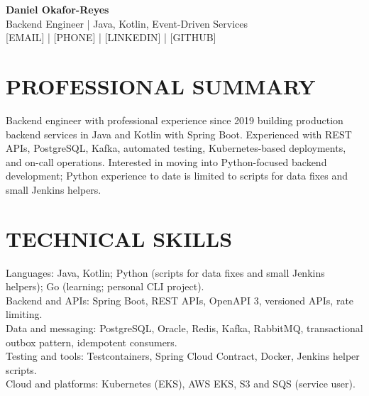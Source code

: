 \documentclass[11pt,a4paper]{article}
\begin{document}
\begin{center}
{\Huge\bfseries\color{primarycolor} Daniel Okafor-Reyes}\\[0.3em]
{\large\color{accentcolor} Backend Engineer | Java, Kotlin, Event-Driven Services}\\[0.2em]
{\small [EMAIL] | [PHONE] | [LINKEDIN] | [GITHUB]}
\end{center}

\section*{PROFESSIONAL SUMMARY}
Backend engineer with professional experience since 2019 building production backend services in Java and Kotlin with Spring Boot. Experienced with REST APIs, PostgreSQL, Kafka, automated testing, Kubernetes-based deployments, and on-call operations. Interested in moving into Python-focused backend development; Python experience to date is limited to scripts for data fixes and small Jenkins helpers.

\section*{TECHNICAL SKILLS}
Languages: Java, Kotlin; Python (scripts for data fixes and small Jenkins helpers); Go (learning; personal CLI project).\\
Backend and APIs: Spring Boot, REST APIs, OpenAPI 3, versioned APIs, rate limiting.\\
Data and messaging: PostgreSQL, Oracle, Redis, Kafka, RabbitMQ, transactional outbox pattern, idempotent consumers.\\
Testing and tools: Testcontainers, Spring Cloud Contract, Docker, Jenkins helper scripts.\\
Cloud and platforms: Kubernetes (EKS), AWS EKS, S3 and SQS (service user).
\end{document}
